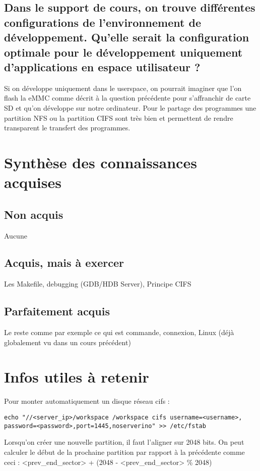 \documentclass{ReportTemplate}
\begin{document}
\subsection{Dans le support de cours, on trouve différentes configurations de l’environnement de développement. Qu’elle serait la configuration optimale pour le développement uniquement d’applications en espace utilisateur ?}
Si on développe uniquement dans le userspace, on pourrait imaginer que l'on
flash la eMMC comme décrit à la question précédente pour s'affranchir de carte
SD et qu'on développe sur notre ordinateur. Pour le partage des programmes une
partition NFS ou la partition CIFS sont très bien et permettent de rendre
transparent le transfert des programmes.
\newpage
\section{Synthèse des connaissances acquises}
\subsection{Non acquis}
Aucune
\subsection{Acquis, mais à exercer}
Les Makefile, debugging (GDB/HDB Server), Principe CIFS
\subsection{Parfaitement acquis}
Le reste comme par exemple ce qui est commande, connexion, Linux (déjà
globalement vu dans un cours précédent)
\section{Infos utiles à retenir}
Pour monter automatiquement un disque réseau cifs : \newline
\begin{verbatim}
echo "//<server_ip>/workspace /workspace cifs username=<username>,
password=<password>,port=1445,noserverino" >> /etc/fstab
\end{verbatim}
Lorsqu'on créer une nouvelle partition, il faut l'aligner sur 2048 bits. On peut
calculer le début de la prochaine partition par rapport à la précédente comme
ceci : \newline
<prev\_end\_sector> + (2048 - <prev\_end\_sector>  \% 2048)
\end{document}
